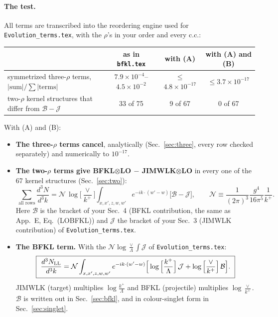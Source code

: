 \documentclass[10pt]{article}
\numberwithin{equation}{section}
\newcommand{\NN}{\mathcal N}
\newcommand{\BB}{\mathcal B}
\newcommand{\JJ}{\mathcal J}
\newcommand{\Lv}{\log\Big[\frac{\vee}{k^+}\Big]}
\newcommand{\pre}{\frac{1}{(2\pi)^3}}
\newcommand{\phw}{e^{-ik\cdot(w'-w)}}
\begin{document}
\paragraph{The test.} All terms are transcribed into the reordering engine used for \texttt{Evolution\_terms.tex}, with the $\rho$'s in your order and every c.c.:
\begin{center}\small
\begin{tabular}{@{}lccc@{}}\toprule
 & as in \texttt{bfkl.tex} & with (A) & with (A) and (B)\\\midrule
symmetrized three-$\rho$ terms, $|\text{sum}|/\sum|\text{terms}|$ & $7.9\times10^{-4}$--$4.5\times10^{-2}$ & $\le$$4.8\times10^{-17}$ & $\le$$3.7\times10^{-17}$\\
two-$\rho$ kernel structures that differ from $\BB-\JJ$ & 33 of 75 & 9 of 67 & 0 of 67\\\bottomrule
\end{tabular}
\end{center}
With (A) and (B):
\begin{itemize}
\item \textbf{The three-$\rho$ terms cancel}, analytically (Sec.~\ref{sec:three}, every row checked separately) and numerically to $10^{-17}$.
\item \textbf{The two-$\rho$ terms give BFKL$\otimes$LO $-$ JIMWLK$\otimes$LO} in every one of the 67 kernel structures (Sec.~\ref{sec:two}):
\begin{equation}
\boxed{\ \sum_{\text{all rows}}\frac{d^3N}{d^3k}=\NN\,\Lv\int_{x,x',z,w,w'}\phw\Big[\BB-\JJ\Big],\qquad \NN\equiv\pre\frac{g^4}{16\pi^5}\frac{1}{k^+}.\ }
\label{eq:main}
\end{equation}
Here $\BB$ is the bracket of your Sec.~4 (BFKL contribution, the same as App.~E, Eq.~(LOBFKL)) and $\JJ$ the bracket of your Sec.~3 (JIMWLK contribution) of \texttt{Evolution\_terms.tex}.
\item \textbf{The BFKL term.} With the $\NN\log\frac{\vee}{\Lambda}\int\JJ$ of \texttt{Evolution\_terms.tex}:
\begin{equation}
\boxed{\ \frac{d^3N_{\rm LL}}{d^3k}=\NN\int_{x,x',z,w,w'}\phw\Big[\log\Big[\frac{k^+}{\Lambda}\Big]\,\JJ+\log\Big[\frac{\vee}{k^+}\Big]\,\BB\Big].\ }
\label{eq:LL}
\end{equation}
JIMWLK (target) multiplies $\log\frac{k^+}{\Lambda}$ and BFKL (projectile) multiplies $\log\frac{\vee}{k^+}$. $\BB$ is written out in Sec.~\ref{sec:bfkl}, and in colour-singlet form in Sec.~\ref{sec:singlet}.
\end{itemize}
\end{document}
